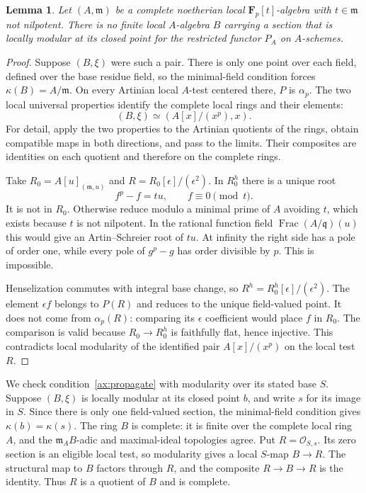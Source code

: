 \documentclass[11pt]{article}
\newtheorem{lemma}[theorem]{Lemma}
\theoremstyle{definition}\newtheorem{definition}[theorem]{Definition}
\theoremstyle{remark}\newtheorem{remark}[theorem]{Remark}
\newcommand{\F}{\mathbf F}
\begin{document}
\begin{lemma}\label{lem:no-model}
Let $(A,\mathfrak m)$ be a complete noetherian local $\F_p[t]$-algebra with $t\in\mathfrak m$ not nilpotent. There is no finite local $A$-algebra $B$ carrying a section that is locally modular at its closed point for the restricted functor $P_A$ on $A$-schemes.
\end{lemma}
\begin{proof}
Suppose $(B,\xi)$ were such a pair. There is only one point over each field, defined over the base residue field, so the minimal-field condition forces $\kappa(B)=A/\mathfrak m$. On every Artinian local $A$-test centered there, $P$ is $\alpha_p$. The two local universal properties identify the complete local rings and their elements:
\[
 (B,\xi)\simeq(A[x]/(x^p),x).
\]
For detail, apply the two properties to the Artinian quotients of the rings, obtain compatible maps in both directions, and pass to the limits. Their composites are identities on each quotient and therefore on the complete rings.

Take $R_0=A[u]_{(\mathfrak m,u)}$ and $R=R_0[\epsilon]/(\epsilon^2)$. In $R_0^h$ there is a unique root
\[
 f^p-f=tu,\qquad f\equiv0\pmod t.
\]
It is not in $R_0$. Otherwise reduce modulo a minimal prime of $A$ avoiding $t$, which exists because $t$ is not nilpotent. In the rational function field $\operatorname{Frac}(A/\mathfrak q)(u)$ this would give an Artin--Schreier root of $tu$. At infinity the right side has a pole of order one, while every pole of $g^p-g$ has order divisible by $p$. This is impossible.

Henselization commutes with integral base change, so $R^h=R_0^h[\epsilon]/(\epsilon^2)$. The element $\epsilon f$ belongs to $P(R)$ and reduces to the unique field-valued point. It does not come from $\alpha_p(R)$: comparing its $\epsilon$ coefficient would place $f$ in $R_0$. The comparison is valid because $R_0\to R_0^h$ is faithfully flat, hence injective. This contradicts local modularity of the identified pair $A[x]/(x^p)$ on the local test $R$.
\end{proof}

We check condition~\ref{ax:propagate} with modularity over its stated base $S$. Suppose $(B,\xi)$ is locally modular at its closed point $b$, and write $s$ for its image in $S$. Since there is only one field-valued section, the minimal-field condition gives $\kappa(b)=\kappa(s)$. The ring $B$ is complete: it is finite over the complete local ring $A$, and the $\mathfrak m_A B$-adic and maximal-ideal topologies agree. Put $R=\mathcal O_{S,s}$. Its zero section is an eligible local test, so modularity gives a local $S$-map $B\to R$. The structural map to $B$ factors through $R$, and the composite $R\to B\to R$ is the identity. Thus $R$ is a quotient of $B$ and is complete.
\end{document}
